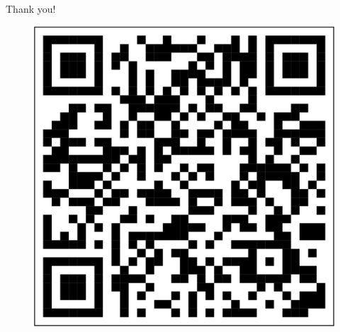 \documentclass{beamer}
\begin{document}
\begin{frame}
  \begin{center}
    {\Huge\calligra Thank you!}
  \end{center}
  \begin{figure}[htbp]
    \centering
    \includegraphics[height=.3\textheight]{url.pdf}
  \end{figure}
\end{frame}
\end{document}

